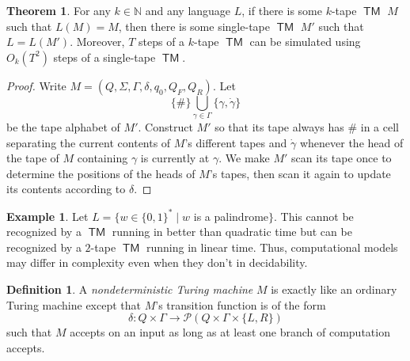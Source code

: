 \documentclass[10pt,letterpaper,cm]{nupset}
\theoremstyle{definition}
\newtheorem*{definition}{Definition}
\newtheorem{exmp}{Example}
\newtheorem{theorem}{Theorem}
\newcommand{\N}{\mathbb N}
\renewcommand{\P}{\mathcal P}
\newcommand{\1}{\mathbf{1}}
\newcommand{\0}{\vec 0}
\DeclareMathOperator{\TM}{\mathsf{TM}}
\begin{document}
\begin{theorem}
For any $k\in \N$ and any language $L$, if there is some $k$-tape $\TM$ $M$ such that $L(M) = M$, then there is some single-tape $\TM$ $M'$ such that $L = L(M')$. Moreover, $T$ steps of a $k$-tape $\TM$ can be simulated using $O_k(T^2)$ steps of a single-tape $\TM$.
\end{theorem}
\begin{proof}
Write $M= (Q, \Sigma, \Gamma, \delta, q_0, Q_F, Q_R)$. Let $$ \{\#\} \bigcup_{\gamma \in \Gamma} \{\gamma, \dot{\gamma} \}$$ be the tape alphabet of $M'$. Construct $M'$ so that its tape always has $\#$ in a cell separating  the current contents of $M$'s different tapes and $\dot{\gamma}$ whenever the head of the tape of $M$ containing $\gamma$ is currently at $\gamma$. We make $M'$ scan its tape once to determine the positions of the heads of $M$'s tapes, then scan it again to update its contents according to $\delta$.
\end{proof}

\begin{exmp}
Let $L = \{w \in \{0,1\}^{\ast} \mid w$ is a palindrome$\}$. This cannot be recognized by a $\TM$ running in better than quadratic time  but can be recognized by a $2$-tape $\TM$ running in linear time.  Thus, computational models may differ in complexity even when they don't in decidability.
\end{exmp}

\begin{definition}
A \textit{nondeterministic Turing machine} $M$ is exactly like an ordinary Turing machine except that $M$'s transition function is of the form $$ \delta : Q \times \Gamma \to \P(Q \times \Gamma \times \{L, R\})  $$ such that $M$ accepts on an input as long as at least one branch of computation accepts.
\end{definition}
\end{document}
